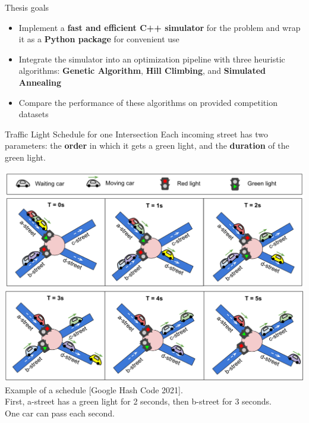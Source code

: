 \documentclass[portrait,a0paper,fontscale=0.28]{baposter}
\begin{document}
\begin{poster}
\begin{posterbox}[column=0, name=goals, below=background, headerColorOne=cyan!60, boxColorOne=cyan!20]{Thesis goals}
\begin{itemize}
\item Implement a \textbf{fast and efficient C++ simulator} for the problem and wrap it as a \textbf{Python package} for convenient use
\item Integrate the simulator into an optimization pipeline with three heuristic algorithms: \textbf{Genetic Algorithm}, \textbf{Hill Climbing}, and \textbf{Simulated Annealing}
\item Compare the performance of these algorithms on provided competition datasets
\end{itemize}

\end{posterbox}

\begin{posterbox}[column=0, name=something1, below=goals]{Traffic Light Schedule for one Intersection}
Each incoming street has two parameters: the \textbf{order} in which it gets a green light, and the \textbf{duration} of the green light.
\begin{center}
\includegraphics[width=1.0\linewidth]{img/figure2-abc.png}
\includegraphics[width=1.0\linewidth]{img/figure2-def.png}
\small{Example of a schedule {[Google Hash Code 2021]}. \\
First, a-street has a green light for 2 seconds, then b-street for 3 seconds. \\
One car can pass each second.}
\end{center}
\end{posterbox}


\end{poster}
\end{document}
